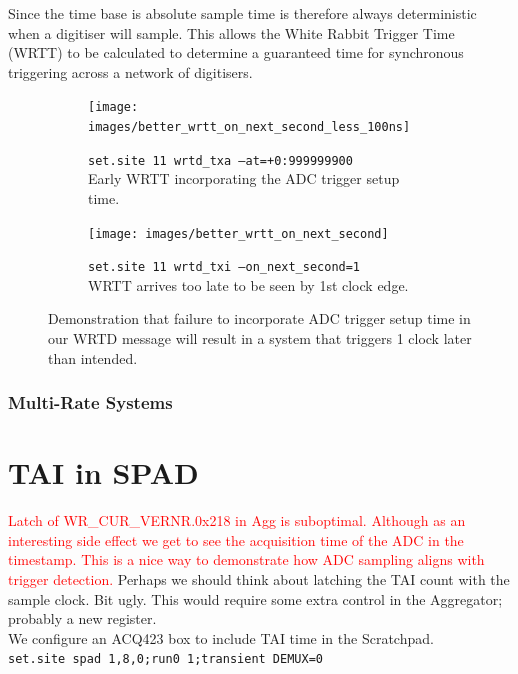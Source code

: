 \documentclass[]{article}
\begin{document}
Since the time base is absolute sample time is therefore always deterministic when a digitiser will sample. This allows the White Rabbit Trigger Time (WRTT) to be calculated to determine a guaranteed time for synchronous triggering across a network of digitisers.

\begin{figure}[H]
	\begin{subfigure}{0.5\textwidth}
		\texttt{[image: images/better\_wrtt\_on\_next\_second\_less\_100ns]}
		\caption{\texttt{set.site 11 wrtd\_txa --at=+0:999999900}\\Early WRTT incorporating the ADC trigger setup time.}
	\end{subfigure}
	\begin{subfigure}{0.5\textwidth}
		\texttt{[image: images/better\_wrtt\_on\_next\_second]}
		\caption{\texttt{set.site 11 wrtd\_txi --on\_next\_second=1}\\WRTT arrives too late to be seen by 1st clock edge.}
	\end{subfigure}
	
	\caption{Demonstration that failure to incorporate ADC trigger setup time in our WRTD message will result in a system that triggers 1 clock later than intended.}
	\label{adc_trig_setup_wrtt}
\end{figure}

\subsubsection{Multi-Rate Systems}

\pagebreak
\section{TAI in SPAD}
\textcolor{red}{Latch of WR\_CUR\_VERNR.0x218 in Agg is suboptimal. Although as an interesting side effect we get to see the acquisition time of the ADC in the timestamp. This is a nice way to demonstrate how ADC sampling aligns with trigger detection.}
Perhaps we should think about latching the TAI count with the sample clock. Bit ugly. This would require some extra control in the Aggregator; probably a new register.\\

We configure an ACQ423 box to include TAI time in the Scratchpad.\\
\texttt{set.site spad 1,8,0;run0 1;transient DEMUX=0}\\
\end{document}
